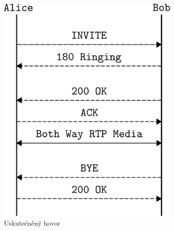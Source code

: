 \documentclass[11pt,a4paper]{article}
\begin{document}
\begin{figure}[htb]
  \centering
  \begin{subfigure}[t]{0.3\textwidth}
    \centering
    \includegraphics[width=\textwidth]{received}
    \caption{Uskutečněný hovor}
    \label{fig:received}
  \end{subfigure}%
  ~ %
  \begin{subfigure}[t]{0.3\textwidth}
    \centering

\end{subfigure}
\end{figure}
\end{document}
